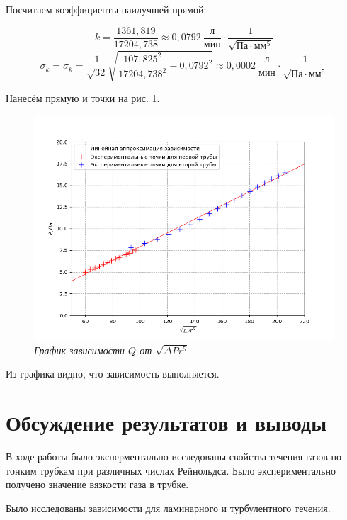 \documentclass[a4paper,12pt]{article}
\begin{document}
Посчитаем коэффициенты наилучшей прямой:

\begin{equation*}
    k = \frac{1361,819}{17204,738} \approx 0,0792 \ \frac{\text{л}}{\text{мин}} \cdot \frac{1}{\sqrt{\text{Па} \cdot \text{мм}^5}}
\end{equation*}
\begin{equation*}
    \sigma_k = \sigma_k = \frac{1}{\sqrt{32}} \sqrt{\frac{{107,825}^2}{{17204,738}^2} - {0,0792}^2} \approx 0,0002 \ \frac{\text{л}}{\text{мин}} \cdot \frac{1}{\sqrt{\text{Па} \cdot \text{мм}^5}}
\end{equation*}

Нанесём прямую и точки на рис. \ref{graph:q-pr}.

\begin{figure}[h!]
        \centering
	\includegraphics[width=1\textwidth]{graph_q-pr.png}
	\caption{\textit{График зависимости $Q$ от $\sqrt{\Delta P r^5}$}}
	\label{graph:q-pr}
\end{figure}

Из графика видно, что зависимость выполняется.


\section{Обсуждение результатов и выводы}

В ходе работы было эксперментально исследованы свойства течения газов по тонким трубкам при различных числах Рейнольдса. Было экспериментально получено значение вязкости газа в трубке.

Было исследованы зависимости для ламинарного и турбулентного течения.
\end{document}
